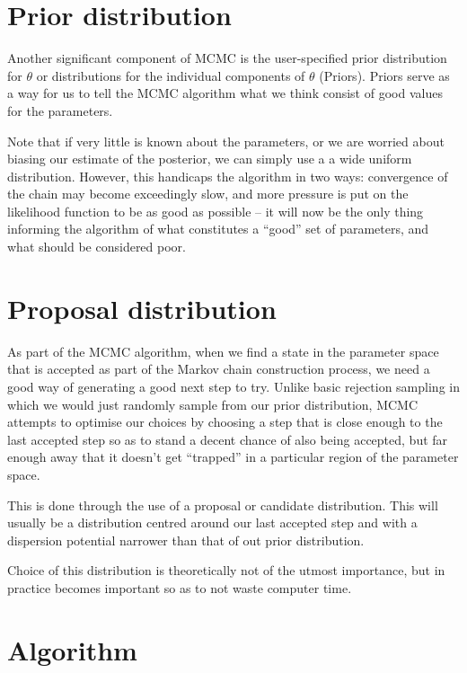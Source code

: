 \section{Prior distribution}

    Another significant component of MCMC is the user-specified prior distribution for $\theta$ or distributions for the individual components of $\theta$ (Priors). Priors serve as a way for us to tell the MCMC algorithm what we think consist of good values for the parameters.

    Note that if very little is known about the parameters, or we are worried about biasing our estimate of the posterior, we can simply use a a wide uniform distribution. However, this handicaps the algorithm in two ways: convergence of the chain may become exceedingly slow, and more pressure is put on the likelihood function to be as good as possible -- it will now be the only thing informing the algorithm of what constitutes a ``good'' set of parameters, and what should be considered poor.


\section{Proposal distribution}

    As part of the MCMC algorithm, when we find a state in the parameter space that is accepted as part of the Markov chain construction process, we need a good way of generating a good next step to try. Unlike basic rejection sampling in which we would just randomly sample from our prior distribution, MCMC attempts to optimise our choices by choosing a step that is close enough to the last accepted step so as to stand a decent chance of also being accepted, but far enough away that it doesn't get ``trapped'' in a particular region of the parameter space.

    This is done through the use of a proposal or candidate distribution. This will usually be a distribution centred around our last accepted step and with a dispersion potential narrower than that of out prior distribution.

    Choice of this distribution is theoretically not of the utmost importance, but in practice becomes important so as to not waste computer time.


\section{Algorithm}

